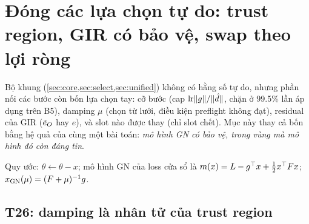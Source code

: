 \section{Đóng các lựa chọn tự do: trust region, GIR có bảo vệ, swap theo lợi ròng}\label{sec:closure}

Bộ khung (\cref{sec:core,sec:select,sec:unified}) không có hằng số tự do, nhưng phần nối các bước còn bốn lựa chọn tay: cỡ bước (cap $\mathrm{lr}\lVert g\rVert/\lVert \hat d\rVert$, chặn ở 99.5\% lần áp dụng trên B5), damping $\mu$ (chọn từ lưới, điều kiện preflight không đạt), residual của GIR ($\tilde e_O$ hay $e$), và slot nào được thay (chỉ slot chết). Mục này thay cả bốn bằng hệ quả của cùng một bài toán: \emph{mô hình GN có bảo vệ, trong vùng mà mô hình đó còn đáng tin}.

Quy ước: $\theta\leftarrow\theta-x$; mô hình GN của loss cửa sổ là $m(x)=L-g^{\top} x+\tfrac12x^{\top} Fx$; $x_{\mathrm{GN}}(\mu)=(F+\mu)^{-1}g$.

\subsection{T26: damping là nhân tử của trust region}

